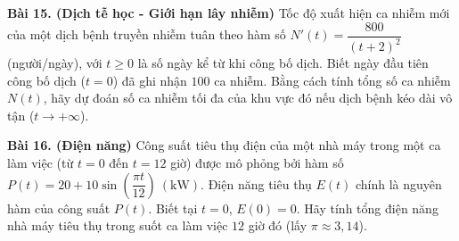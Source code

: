 \documentclass[12pt]{article}
\begin{document}
\begin{btvang}[]
		\textbf{Bài 15. (Dịch tễ học - Giới hạn lây nhiễm)} Tốc độ xuất hiện ca nhiễm mới của một dịch bệnh truyền nhiễm tuân theo hàm số $N'(t) = \dfrac{800}{(t+2)^2}$ (người/ngày), với $t \ge 0$ là số ngày kể từ khi công bố dịch. Biết ngày đầu tiên công bố dịch ($t = 0$) đã ghi nhận $100$ ca nhiễm. Bằng cách tính tổng số ca nhiễm $N(t)$, hãy dự đoán số ca nhiễm tối đa của khu vực đó nếu dịch bệnh kéo dài vô tận ($t \to +\infty$).
		
		\textbf{Bài 16. (Điện năng)} Công suất tiêu thụ điện của một nhà máy trong một ca làm việc (từ $t = 0$ đến $t = 12$ giờ) được mô phỏng bởi hàm số $P(t) = 20 + 10\sin\left(\dfrac{\pi t}{12}\right) \ (\text{kW})$. Điện năng tiêu thụ $E(t)$ chính là nguyên hàm của công suất $P(t)$. Biết tại $t = 0$, $E(0) = 0$. Hãy tính tổng điện năng nhà máy tiêu thụ trong suốt ca làm việc $12$ giờ đó (lấy $\pi \approx 3,14$).
	\end{btvang}
	
\end{document}
